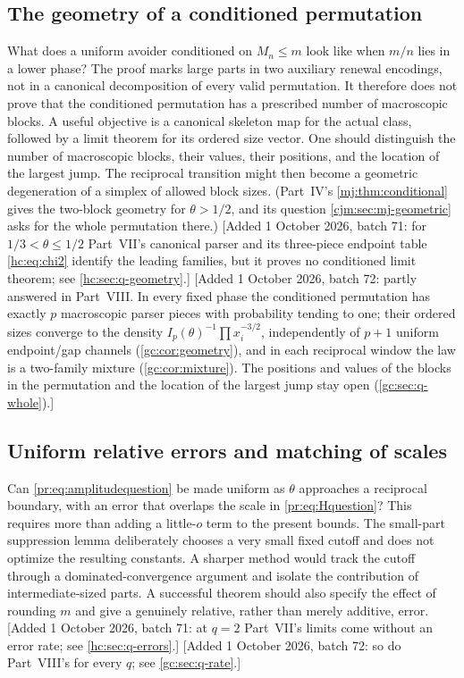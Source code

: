 \documentclass[11pt,a4paper]{article}
\theoremstyle{definition}\newaliascnt{definition}{theorem}
\theoremstyle{remark}\newaliascnt{remark}{theorem}
\begin{document}
\subsection{The geometry of a conditioned permutation}
\label{pr:sec:q-geometry}
What does a uniform avoider conditioned on $M_n\le m$ look like when $m/n$
lies in a lower phase? The proof marks large parts in two auxiliary renewal
encodings, not in a canonical decomposition of every valid permutation. It
therefore does not prove that the conditioned permutation has a prescribed
number of macroscopic blocks. A useful objective is a canonical skeleton map
for the actual class, followed by a limit theorem for its ordered size
vector. One should distinguish the number of macroscopic blocks, their
values, their positions, and the location of the largest jump. The
reciprocal transition might then become a geometric degeneration of a
simplex of allowed block sizes. (Part~IV's \cref{mj:thm:conditional} gives
the two-block geometry for $\theta>1/2$, and its question
\cref{cjm:sec:mj-geometric} asks for the whole permutation there.)
[Added 1 October 2026, batch 71: for $1/3<\theta\le1/2$ Part~VII's canonical
parser and its three-piece endpoint table \eqref{hc:eq:chi2} identify the
leading families, but it proves no conditioned limit theorem; see
\cref{hc:sec:q-geometry}.]
[Added 1 October 2026, batch 72: partly answered in Part~VIII. In every fixed
phase the conditioned permutation has exactly $p$ macroscopic parser pieces
with probability tending to one; their ordered sizes converge to the density
$I_p(\theta)^{-1}\prod x_i^{-3/2}$, independently of $p+1$ uniform
endpoint/gap channels (\cref{gc:cor:geometry}), and in each reciprocal window
the law is a two-family mixture (\cref{gc:cor:mixture}). The positions and
values of the blocks in the permutation and the location of the largest jump
stay open (\cref{gc:sec:q-whole}).]

\subsection{Uniform relative errors and matching of scales}
\label{pr:sec:q-uniform}
Can \eqref{pr:eq:amplitudequestion} be made uniform as $\theta$ approaches a
reciprocal boundary, with an error that overlaps the scale in
\eqref{pr:eq:Hquestion}? This requires more than adding a little-$o$ term to
the present bounds. The small-part suppression lemma deliberately chooses a
very small fixed cutoff and does not optimize the resulting constants. A
sharper method would track the cutoff through a dominated-convergence
argument and isolate the contribution of intermediate-sized parts. A
successful theorem should also specify the effect of rounding $m$ and give a
genuinely relative, rather than merely additive, error.
[Added 1 October 2026, batch 71: at $q=2$ Part~VII's limits come without an
error rate; see \cref{hc:sec:q-errors}.]
[Added 1 October 2026, batch 72: so do Part~VIII's for every $q$; see
\cref{gc:sec:q-rate}.]
\end{document}
